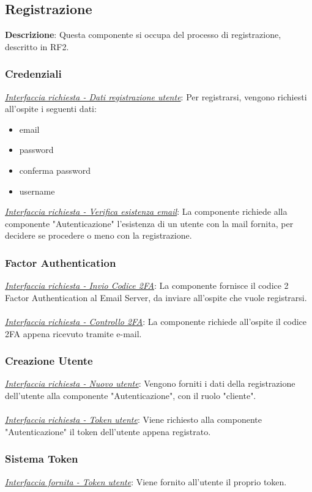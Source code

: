 \documentclass{report}
\begin{document}
\subsection*{Registrazione}
\textbf{Descrizione}: Questa componente si occupa del processo di registrazione, descritto in RF2.
\subsubsection*{\indent \indent Credenziali}
\uline{\textit{Interfaccia richiesta - Dati registrazione utente}}: 
Per registrarsi, vengono richiesti all'ospite i seguenti dati:
\begin{itemize}
	\item email
	\item password
	\item conferma password
	\item username
\end{itemize}
\uline{\textit{Interfaccia richiesta - Verifica esistenza email}}: 
La componente richiede alla componente "Autenticazione" l'esistenza di un utente con la mail fornita,
per decidere se procedere o meno con la registrazione.
\subsubsection*{\indent {} Factor Authentication}
\uline{\textit{Interfaccia richiesta - Invio Codice 2FA}}: 
La componente fornisce il codice 2 Factor Authentication al Email Server, da inviare all'ospite che vuole registrarsi.\\ \\ 
\uline{\textit{Interfaccia richiesta - Controllo 2FA}}: 
La componente richiede all'ospite il codice 2FA appena ricevuto tramite e-mail.
\subsubsection*{\indent \indent Creazione Utente}
\uline{\textit{Interfaccia richiesta - Nuovo utente}}: 
Vengono forniti i dati della registrazione dell'utente alla componente "Autenticazione", con il ruolo "cliente".\\ \\ 
\uline{\textit{Interfaccia richiesta - Token utente}}: 
Viene richiesto alla componente "Autenticazione" il token dell'utente appena registrato.
\subsubsection*{\indent \indent Sistema Token}
\uline{\textit{Interfaccia fornita - Token utente}}: 
Viene fornito all'utente il proprio token.
\end{document}
